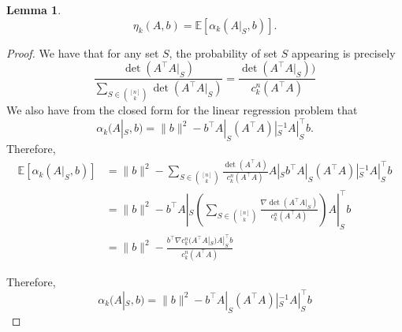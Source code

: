 \documentclass[a4paper]{article}
\newtheorem{lemma}{Lemma}
\newcommand{\E}{\mathbb{E}}
\newcommand{\ksets}{\binom{[n]}{k}}
\begin{document}
\begin{lemma}
    \[
        \eta_k(A, b) = \E[\alpha_k(A|_S, b)].
    \]
\end{lemma}
\begin{proof}
    We have that for any set $S$, the probability of set $S$ appearing is precisely
    \[
        \frac{\det(A^{\intercal}A|_S)}{\sum_{S \in \ksets} \det(A^{\intercal}A|_S)} = \frac{\det(A^{\intercal}A|_S))}{c_k^n(A^{\intercal}A)}
    \]
    We also have from the closed form for the linear regression problem that
    \[
        \alpha_k(A|_S,b) = \|b\|^2 - b^{\intercal}A|_S(A^{\intercal}A)|_S^{-1}A|_S^{\intercal}b.
    \]
    Therefore,
    \begin{align*}
        \E[\alpha_k(A|_S,b)] &= \|b\|^2 - \sum_{S \in \ksets} \frac{\det(A^{\intercal}A)}{c_k^n(A^{\intercal}A)}A|_Sb^{\intercal}A|_S(A^{\intercal}A)|_S^{-1}A|_S^{\intercal}b\\
                             &= \|b\|^2 - b^{\intercal}A|_S\left( \sum_{S \in \ksets} \frac{\nabla \det(A^{\intercal}A|_S)}{c_k^n(A^{\intercal}A)} \right)A|_S^{\intercal}b\\
                             &= \|b\|^2 - \frac{b^{\intercal}\nabla c_k^n(A^{\intercal}A|_S)A|_S^{\intercal}b}{c_k^n(A^{\intercal}A)}
    \end{align*}



    Therefore,
    \[
        \alpha_k(A|_S,b) = \|b\|^2 - b^{\intercal}A|_S(A^{\intercal}A)|_S^{-1}A|_S^{\intercal}b
    \]
\end{proof}
\end{document}
